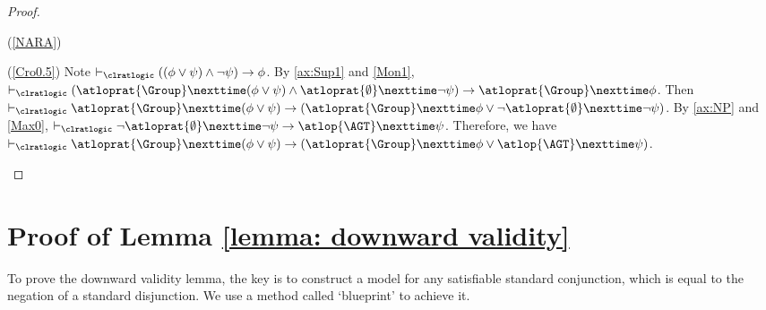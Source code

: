 \begin{proof}
\begin{itemlist}{(\ref{NARA})}
      \item[(\ref{Cro0.5})] Note $\vdash_{\clratlogic} ((\phi \lor \psi)\wedge  \neg \psi)\to \phi $. By \ref{ax:Sup1} and \ref{Mon1}, $\vdash_{\clratlogic} (\atloprat{\Group} \nexttime (\phi \lor \psi)\wedge \atloprat{\emptyset }\nexttime \neg \psi) \to \atloprat{\Group }\nexttime \phi$. Then $\vdash_{\clratlogic} \atloprat{\Group} \nexttime (\phi \lor \psi)\to ( \atloprat{\Group }\nexttime \phi \vee \neg \atloprat{\emptyset }\nexttime \neg \psi)$. By \ref{ax:NP} and \ref{Max0}, $\vdash_{\clratlogic} \neg \atloprat{\emptyset }\nexttime \neg \psi \to \atlop{\AGT }\nexttime \psi $. Therefore,  we have 
      $\vdash_{\clratlogic} \atloprat{\Group} \nexttime (\phi \lor  \psi) \rightarrow (\atloprat{\Group} \nexttime \phi \allowbreak \lor \allowbreak \atlop{\AGT} \nexttime \psi)$. 
    \end{itemlist}
\end{proof}

\section{Proof of Lemma \ref{lemma: downward validity}}
\label{section: downward validity}
To prove the downward validity lemma, the key is  to construct a model for any satisfiable standard conjunction, which is equal to the negation of a standard disjunction. We use a method called `blueprint' to achieve it.

